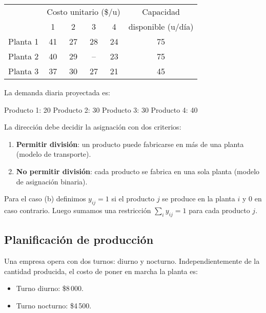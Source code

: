 \documentclass[12pt]{article}
\begin{document}
\begin{table}[H]
    \centering
    \begin{tabular}{c|cccc|c}
        \toprule
         & \multicolumn{4}{c|}{Costo unitario (\$/u)} & Capacidad \\[-0.3em]
         & 1 & 2 & 3 & 4 & disponible (u/día) \\
        \midrule
        Planta 1 & 41 & 27 & 28 & 24 & 75 \\
        Planta 2 & 40 & 29 & -- & 23 & 75 \\
        Planta 3 & 37 & 30 & 27 & 21 & 45 \\
        \bottomrule
    \end{tabular}
\end{table}

La demanda diaria proyectada es:
\begin{center}
    Producto 1: 20 \hspace{1em} Producto 2: 30 \hspace{1em} Producto 3: 30 \hspace{1em} Producto 4: 40
\end{center}

La dirección debe decidir la asignación con dos criterios:
\begin{enumerate}[label=\alph*)]
    \item \textbf{Permitir división}: un producto puede fabricarse en más de una planta (modelo de transporte).
    \item \textbf{No permitir división}: cada producto se fabrica en una sola planta (modelo de asignación binaria).
\end{enumerate}

Para el caso (b) definimos $y_{ij} = 1$ si el producto $j$ se produce en la planta $i$ y $0$ en caso contrario. Luego sumamos una restricción $\sum_i y_{ij} = 1$ para cada producto $j$.

\subsection{Planificación de producción}
Una empresa opera con dos turnos: diurno y nocturno. Independientemente de la cantidad producida, el costo de poner en marcha la planta es:
\begin{itemize}
    \item Turno diurno: \$8\,000.
    \item Turno nocturno: \$4\,500.
\end{itemize}
\end{document}
